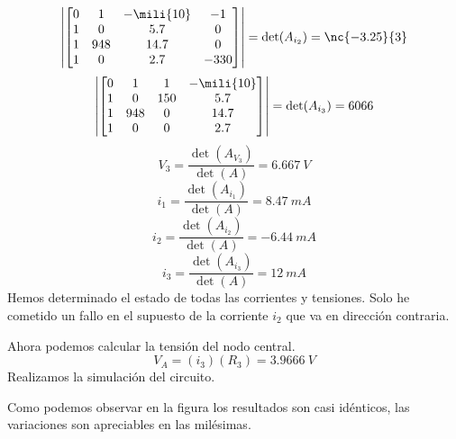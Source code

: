 \begin{equation}
\left| \begin{bmatrix}
0 & 1 & -\mili{10} & -1\\
1 & 0 & 5.7 & 0\\
1 & 948 & 14.7 & 0\\
1 & 0 & 2.7 & -330
\end{bmatrix}\right|=\det(A_{i_2}) = \nc{-3.25}{3}
\end{equation}
\begin{equation}
\left| \begin{bmatrix}
0 & 1 & 1 & -\mili{10}\\
1 & 0 & 150 & 5.7\\
1 & 948 & 0 & 14.7\\
1 & 0 & 0 & 2.7
\end{bmatrix}\right|=\det(A_{i_3}) = 6066
\end{equation}
\begin{equation}
    V_3 = \dfrac{\det(A_{V_3})}{\det(A)} = 6.667 \ V
\end{equation}
\begin{equation}
    i_1 = \dfrac{\det(A_{i_1})}{\det(A)} = 8.47 \ mA
\end{equation}
\begin{equation}
    i_2 = \dfrac{\det(A_{i_2})}{\det(A)} = -6.44 \ mA
\end{equation}
\begin{equation}
    i_3 = \dfrac{\det(A_{i_3})}{\det(A)} = 12 \ mA
\end{equation}
Hemos determinado el estado de todas las corrientes y tensiones. Solo he cometido un fallo en el supuesto de la corriente $i_2$ que va en dirección contraria.

Ahora podemos calcular la tensión del nodo central.
\begin{equation}
    V_{A} = (i_3)(R_3) = 3.9666 \ V
\end{equation}
Realizamos la simulación del circuito.
\vspace{-1em}
\begin{figure}[H]
\centering
\end{figure}
Como podemos observar en la figura los resultados son casi idénticos, las variaciones son apreciables en las milésimas.



